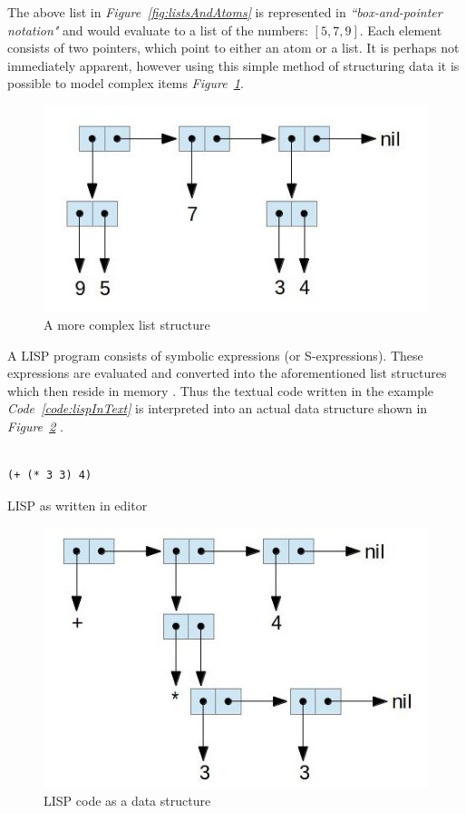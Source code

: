 \documentclass[12pt,a4paper]{article}
\begin{document}
The above list in \textit{Figure~\ref{fig:listsAndAtoms}} is represented in \textit{``box-and-pointer notation"} \cite{structureAndInterpretation} and  would evaluate to a list of the numbers: $[5, 7, 9]$. Each element consists of two pointers, which point to either an atom or a list. It is perhaps not immediately apparent, however using this simple method of structuring data it is possible to model complex items \textit{Figure~\ref{fig:listsAndAtoms2}}.

\begin{figure}[h]
  \centering
  \includegraphics[scale=.5]{list2}
  \caption{A more complex list structure}
  \label{fig:listsAndAtoms2}
\end{figure}

A LISP program consists of symbolic expressions (or S-expressions). These expressions are evaluated and converted into the aforementioned list structures which then reside in memory \cite{lispPart1,historyOfLisp}. Thus the textual code written in the example \textit{Code~\ref{code:lispInText}} is interpreted into an actual data structure shown in \textit{Figure~\ref{fig:codeAsData}} \cite{structureAndInterpretation}.

\begin{code}
  \begin{verbatim}

(+ (* 3 3) 4)
  \end{verbatim}
  \caption{LISP as written in editor}
  \label{code:lispInText}
\end{code}

\begin{figure}[h]
  \centering
  \includegraphics[scale=.5]{codeAsData}
  \caption{LISP code as a data structure}
  \label{fig:codeAsData}
\end{figure}
\end{document}
